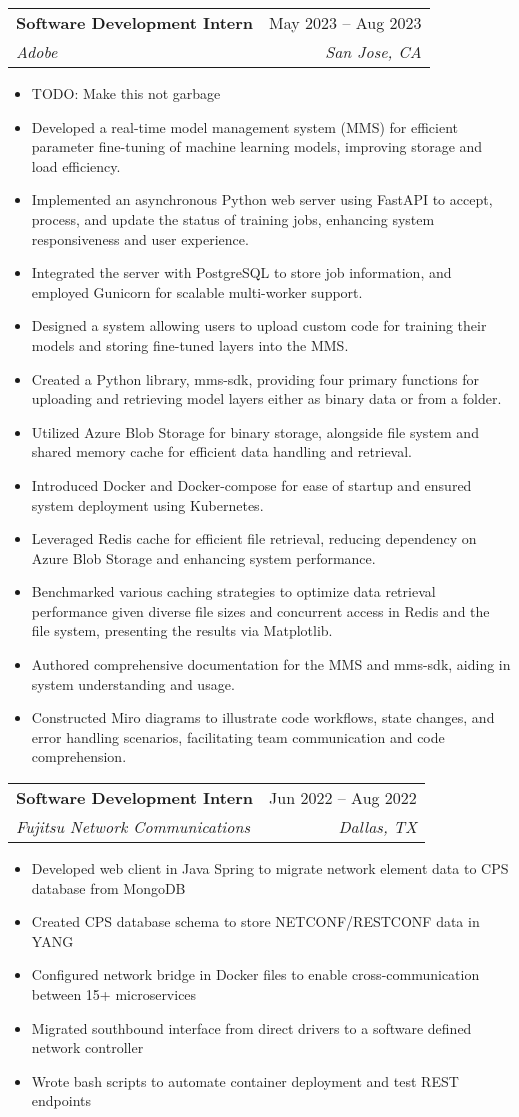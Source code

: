 \documentclass[letterpaper,11pt]{article}
\makeatletter
\newcommand{\resumeItem}[1]{
  \item\small{
    {#1 \vspace{-2pt}}
  }
}
\newcommand{\resumeSubheading}[4]{
  \vspace{-2pt}\item
    \begin{tabular*}{0.97\textwidth}[t]{l@{\extracolsep{\fill}}r}
      \textbf{#1} & #2 \\
      \textit{\small#3} & \textit{\small #4} \\
    \end{tabular*}\vspace{-7pt}
}
\newcommand{\resumeSubSubheading}[2]{
    \item
    \begin{tabular*}{0.97\textwidth}{l@{\extracolsep{\fill}}r}
      \textit{\small#1} & \textit{\small #2} \\
    \end{tabular*}\vspace{-7pt}
}
\newcommand{\resumeSubHeadingListEnd}{\end{itemize}}
\newcommand{\resumeItemListStart}{\begin{itemize}}
\newcommand{\resumeItemListEnd}{\end{itemize}\vspace{-5pt}}
\makeatother
\begin{document}
    \resumeSubheading
      {Software Development Intern}{May 2023 -- Aug 2023}
      {Adobe}{San Jose, CA}
      \resumeItemListStart
        \resumeItem{TODO: Make this not garbage}
        \resumeItem{Developed a real-time model management system (MMS) for efficient parameter fine-tuning of machine learning models, improving storage and load efficiency.}
        \resumeItem{Implemented an asynchronous Python web server using FastAPI to accept, process, and update the status of training jobs, enhancing system responsiveness and user experience.}
        \resumeItem{Integrated the server with PostgreSQL to store job information, and employed Gunicorn for scalable multi-worker support.}
        \resumeItem{Designed a system allowing users to upload custom code for training their models and storing fine-tuned layers into the MMS.}
        \resumeItem{Created a Python library, mms-sdk, providing four primary functions for uploading and retrieving model layers either as binary data or from a folder.}
        \resumeItem{Utilized Azure Blob Storage for binary storage, alongside file system and shared memory cache for efficient data handling and retrieval.}
        \resumeItem{Introduced Docker and Docker-compose for ease of startup and ensured system deployment using Kubernetes.}
        \resumeItem{Leveraged Redis cache for efficient file retrieval, reducing dependency on Azure Blob Storage and enhancing system performance.}
        \resumeItem{Benchmarked various caching strategies to optimize data retrieval performance given diverse file sizes and concurrent access in Redis and the file system, presenting the results via Matplotlib.}
        \resumeItem{Authored comprehensive documentation for the MMS and mms-sdk, aiding in system understanding and usage.}
        \resumeItem{Constructed Miro diagrams to illustrate code workflows, state changes, and error handling scenarios, facilitating team communication and code comprehension.}
      \resumeItemListEnd
      

    \resumeSubheading
      {Software Development Intern}{Jun 2022 -- Aug 2022}
      {Fujitsu Network Communications}{Dallas, TX}
      \resumeItemListStart
        \resumeItem{Developed web client in Java Spring to migrate network element data to CPS database from MongoDB}
        \resumeItem{Created CPS database schema to store NETCONF/RESTCONF data in YANG}
        \resumeItem{Configured network bridge in Docker files to enable cross-communication between 15+ microservices}
        \resumeItem{Migrated southbound interface from direct drivers to a software defined network controller}
        \resumeItem{Wrote bash scripts to automate container deployment and test REST endpoints}
    \resumeItemListEnd
\end{document}
